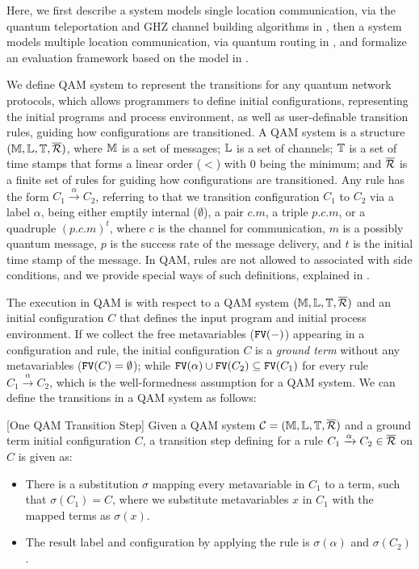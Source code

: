 Here, we first describe a system models single location communication, via the quantum teleportation and GHZ channel building algorithms in , then a system models multiple location communication, via quantum routing in ,
and formalize an evaluation framework based on the model in .

We define QAM system to represent the transitions for any quantum network protocols, which allows programmers to define initial configurations, representing the initial programs and process environment, as well as user-definable transition rules, guiding how configurations are transitioned. A QAM system is a structure $(\mathbb{M},\mathbb{L},\mathbb{T},\overline{\mathcal{R}})$,
where $\mathbb{M}$ is a set of messages;
$\mathbb{L}$ is a set of channels;
$\mathbb{T}$ is a set of time stamps that forms a linear order ($<$) with $0$ being the minimum;
and $\overline{\mathcal{R}}$ is a finite set of rules for guiding how configurations are transitioned. 
Any rule has the form $C_1 \xrightarrow{\alpha} C_2$, referring to that we transition configuration $C_1$ to $C_2$ via a label $\alpha$, being either emptily internal ($\emptyset$), a pair $c.m$, a triple $p.c.m$, or a quadruple $(p.c.m)^t$, where $c$ is the channel for communication, $m$ is a possibly quantum message, $p$ is the success rate of the message delivery, and $t$ is the initial time stamp of the message. In QAM, rules are not allowed to associated with side conditions, and we provide special ways of such definitions, explained in .

The execution in QAM is with respect to a QAM system $(\mathbb{M},\mathbb{L},\mathbb{T},\overline{\mathcal{R}})$ and an initial configuration $C$ that defines the input program and initial process environment.
If we collect the free metavariables ($\texttt{FV}(-)$) appearing in a configuration and rule, 
the initial configuration $C$ is a \textit{ground term} without any metavariables ($\texttt{FV}(C)=\emptyset$);
while $\texttt{FV}(\alpha) \cup \texttt{FV}(C_2)\subseteq \texttt{FV}(C_1)$ for every rule $C_1 \xrightarrow{\alpha} C_2$, which is the well-formedness assumption for a QAM system.
We can define the transitions in a QAM system as follows:

\begin{definition}\label{def:labeledsystem}\rm[One QAM Transition Step]
Given a QAM system $\mathcal{C}=(\mathbb{M},\mathbb{L},\mathbb{T},\overline{\mathcal{R}})$ and a ground term initial configuration $C$, a transition step defining for a rule $C_1 \xrightarrow{\alpha} C_2 \in \overline{\mathcal{R}}$ on $C$ is given as:
\begin{itemize}
\item There is a substitution $\sigma$ mapping every metavariable in $C_1$ to a term, such that $\sigma(C_1)=C$, where we substitute metavariables $x$ in $C_1$ with the mapped terms as $\sigma(x)$.
\item The result label and configuration by applying the rule is $\sigma(\alpha)$ and $\sigma(C_2)$.
\end{itemize}
\end{definition}

